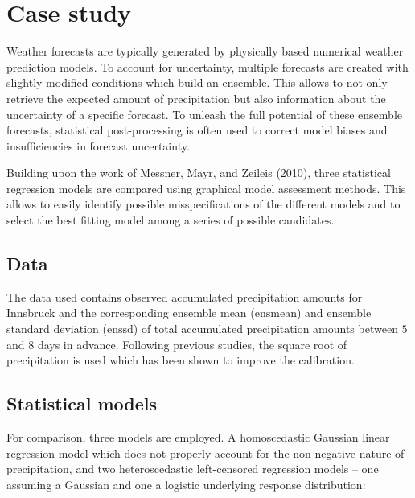 \documentclass[twoside]{report}
\begin{document}

\maketitle



\section{Case study}

Weather forecasts are typically generated by physically based numerical weather
prediction models. To account for uncertainty, multiple forecasts are created
with slightly modified conditions which build an ensemble.
This allows to not only retrieve the expected amount of precipitation
but also information about the uncertainty of a specific forecast.
To unleash the full potential of these ensemble forecasts, statistical
post-processing is often used to correct model biases and insufficiencies in
forecast uncertainty.

Building upon the work of Messner, Mayr, and Zeileis (2010), three statistical
regression models are compared using graphical model assessment methods.
This allows to easily identify possible misspecifications of the different
models and to select the best fitting model among a series of possible candidates.

\subsection{Data}

The data used contains observed accumulated precipitation amounts for
Innsbruck and the corresponding ensemble mean ($\text{ensmean}$) and
ensemble standard deviation ($\text{enssd}$) of total accumulated precipitation amounts
between $5$ and $8$ days in advance.
Following previous studies, the square root of precipitation is used which has
been shown to improve the calibration.

\subsection{Statistical models}

For comparison, three models are employed. A homoscedastic Gaussian linear regression
model which does not properly account for the non-negative nature of precipitation,
and two heteroscedastic left-censored regression models --
one assuming a Gaussian and one a logistic underlying response distribution:
\end{document}

